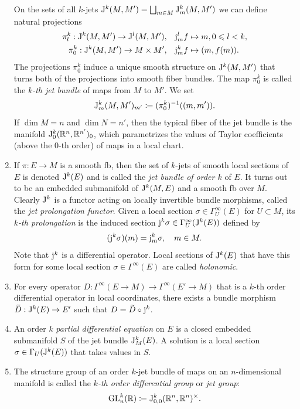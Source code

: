 \begin{defn}
\begin{enumerate}
        On the sets of all $k$-jets $\mathrm{J}^k(M,M')=\bigsqcup_{m\in M}\mathrm{J}^k_m(M,M')$ we can define natural projections
        \begin{align}
            \pi^k_l:\mathrm{J}^k(M,M')\to \mathrm{J}^l(M,M'),&\quad  \mathrm{j}_m^l f\mapsto m, 0\leqslant l<k,\\
            \pi^k_0:\mathrm{J}^k(M,M')\to M\times M',&\quad \mathrm{j}_m^k f\mapsto (m,f(m)).
        \end{align}
        The projections $\pi^k_0$ induce a unique smooth structure on $\mathrm{J}^k(M,M')$ that turns both of the projections into smooth fiber bundles. The map $\pi^k_0$ is called the \emph{$k$-th jet bundle} of maps from $M$ to $M'$.
        We set
        \[\mathrm{J}^k_{m}(M,M')_{m'}\coloneqq (\pi^k_0)^{-1}((m,m')).\]
        If $\dim M=n$ and $\dim N=n'$, then the typical fiber of the jet bundle is the manifold $\mathrm{J}^k_{0}(\mathbb{R}^n,\mathbb{R}^{n'})_0$, which parametrizes the values of Taylor coefficients (above the $0$-th order) of maps in a local chart.
        \item If $\pi:E\to M$ is a smooth \gls{fb}, then the set of $k$-jets of smooth local sections of $E$ is denoted $\mathrm{J}^k(E)$ and is called the \emph{jet bundle of order $k$} of $E$. It turns out to be an embedded submanifold of $\mathrm{J}^k(M,E)$ and a smooth \gls{fb} over $M$. Clearly $\mathrm{J}^k$ is a functor acting on locally invertible bundle morphisms, called the \emph{jet prolongation functor}. Given a local section $\sigma\in \Gamma_U^\infty(E)$ for $U\subset M$, its \emph{$k$-th prolongation} is the induced section $\mathrm{j}^k\sigma\in\Gamma_U^\infty(\mathrm{J}^k(E))$ defined by
        \[(\mathrm{j}^k\sigma)(m)=\mathrm{j}^k_m\sigma,\quad m\in M.\]
        Note that $\mathrm{j}^k$ is a differential operator. Local sections of $\mathrm{J}^k(E)$ that have this form for some local section $\sigma\in\Gamma^\infty(E)$ are called \emph{holonomic}.
        \item For every operator $D:\Gamma^\infty(E\to M)\to \Gamma^\infty(E'\to M)$ that is a $k$-th order differential operator in local coordinates, there exists a bundle morphism $\wt D:\rmJ^k(E)\to E'$ such that $D=\wt D\circ \rmj^k$.
        \item An order $k$ \emph{partial differential equation} on $E$ is a closed embedded submanifold $S$ of the jet bundle $\mathrm{J}^k_M(E)$. A solution is a local section $\sigma\in\Gamma_U(\mathrm{J}^k(E))$ that takes values in $S$. 
        \item The structure group of an order $k$-jet bundle of maps on an $n$-dimensional manifold is called the \emph{$k$-th order differential group} or \emph{jet group}: 
        \[\operatorname{GL}^k_n(\mathbb{R})\coloneqq \mathrm{J}^k_{0,0}(\mathbb{R}^n,\mathbb{R}^n)^\times.\]
    \end{enumerate}
\end{defn}

